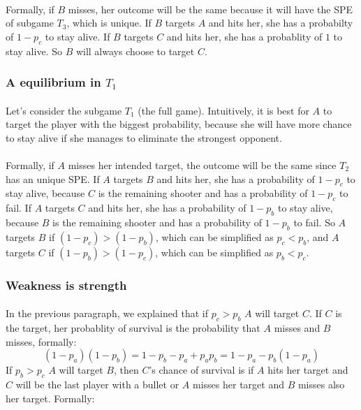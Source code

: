 \documentclass[letterpaper]{article}
\begin{document}
\paragraph{}
Formally, if $B$ misses, her outcome will be the same because it will have
the SPE of subgame $T_3$, which is unique.
If $B$ targets $A$ and hits her, she has
a probabilty of $1 - p_c$ to stay alive. If $B$ targets $C$ and hits her, she
has a probablity of $1$ to stay alive. So $B$ will always choose to target $C$.

\subsubsection{A equilibrium in $T_1$}

\paragraph{}


Let's consider the subgame $T_1$ (the full game). Intuitively, it is best for
$A$ to target the player with the biggest probability, because she will have
more chance to stay alive if she manages to eliminate the strongest opponent.

\paragraph{}

Formally, if $A$ misses her intended target, the outcome will be the same
since $T_2$ has an unique SPE. If $A$ targets $B$ and hits her, she has
a probability of $1 - p_c$ to stay alive, because $C$ is
the remaining shooter and has a probability of $1 - p_c$ to fail.
If $A$ targets $C$ and hits her,
she has a probability of $1 - p_b$ to stay alive, because $B$ is
the remaining shooter and has a probability of $1 - p_b$ to fail.
So $A$ targets $B$ if
$ (1 - p_c) > (1 - p_b)$, which can be simplified as
$p_c < p_b$, and $A$ targets $C$
if $(1 - p_b) > (1 - p_c)$, which can be simplified as $p_b < p_c$.


\subsubsection{Weakness is strength}

\paragraph{}

In the previous paragraph, we explained that if $p_c > p_b$
$A$ will target $C$. If $C$ is the target, her probablity of survival
is the probability that $A$ misses and $B$ misses,
formally:
\begin{equation}
    \label{weak:1}
    (1 - p_a)(1 - p_b) = 1 - p_b - p_a + p_ap_b = 1 - p_a - p_b(1 - p_a)
\end{equation}
If $p_b > p_c$ $A$ will target $B$, then $C$'s chance of survival is
if $A$ hits
her target
and $C$ will be the last player with a bullet or $A$
misses her target and $B$ misses also her target. Formally:
\end{document}
